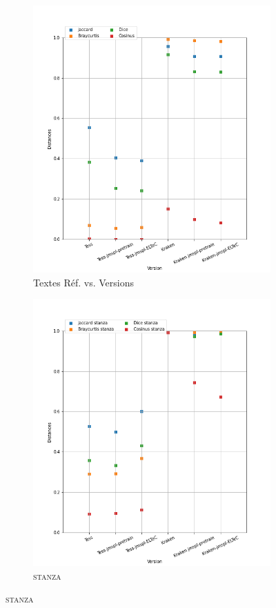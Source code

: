 \begin{figure}[H]
\begin{minipage}{6cm}
  \begin{subfigure}{0.89\textwidth}
  \includegraphics[width=.89\textwidth]{IMAGES/ELTeC_DISTANCES_spaCy3.5.1/REYNOLDS-The-Mysteries-of-London-graph-dist-spaCy3.5.1-txt.png} 
  \caption{Textes Réf. vs. Versions}
  \label{fig:REYNOLDS-txt.pn}
  \end{subfigure}
  \end{minipage}
  \begin{minipage}{6cm}
  \begin{subfigure}{0.89\textwidth}
  \includegraphics[width=.89\textwidth]{IMAGES/ELTeC_DISTANCES_stanza/REYNOLDS-The-Mysteries-of-London-graph-dist-stanza-stanza.png}
   \caption{\textsc{stanza}}
 

\end{subfigure}
\end{minipage}
\end{figure}
